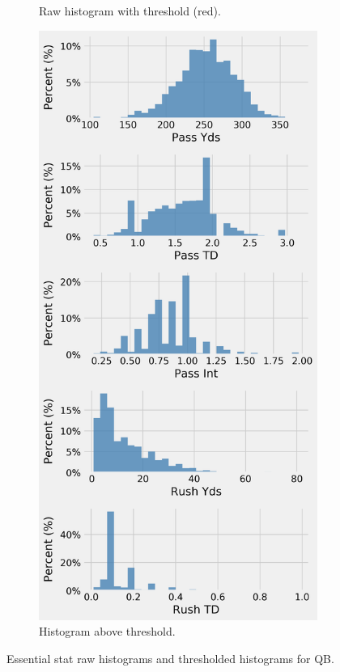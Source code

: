 \documentclass[12pt]{article}
\begin{document}
\begin{figure}[H]
\begin{subfigure}[b]{0.450\textwidth}
    \caption{Raw histogram with threshold (red).}
  \end{subfigure}
  \hfill
  \begin{subfigure}[b]{0.450\textwidth}
    \centering
    \includegraphics[width=1\textwidth]{../figures/threshold_hist_QB}
    \caption{Histogram above threshold.}
  \end{subfigure}
  \caption{Essential stat raw histograms and thresholded histograms for QB.}
\end{figure}
\end{document}
